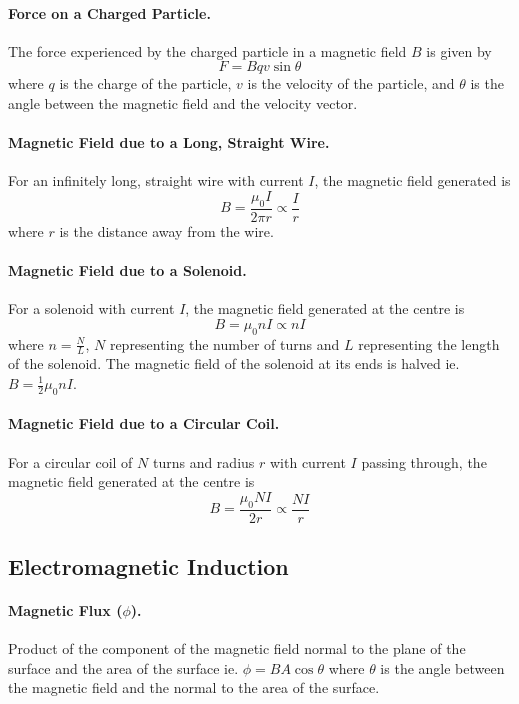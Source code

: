 \documentclass{article}
\begin{document}
\paragraph{Force on a Charged Particle.} The force experienced by the charged particle in a magnetic field $B$ is given by \begin{equation}
F = Bqv\sin\theta
\end{equation} where $q$ is the charge of the particle, $v$ is the velocity of the particle, and $\theta$ is the angle between the magnetic field and the velocity vector.

\paragraph{Magnetic Field due to a Long, Straight Wire.} For an infinitely long, straight wire with current $I$, the magnetic field generated is \begin{equation}
B = \frac{\mu_0I}{2\pi r} \propto \frac{I}{r}
\end{equation} where $r$ is the distance away from the wire.

\paragraph{Magnetic Field due to a Solenoid.} For a solenoid with current $I$, the magnetic field generated at the centre is \begin{equation}
B = \mu_0nI \propto nI
\end{equation} where $n = \frac{N}{L}$, $N$ representing the number of turns and $L$ representing the length of the solenoid. The magnetic field of the solenoid at its ends is halved ie. $B = \frac{1}{2}\mu_0nI$.

\paragraph{Magnetic Field due to a Circular Coil.} For a circular coil of $N$ turns and radius $r$ with current $I$ passing through, the magnetic field generated at the centre is \begin{equation}
B = \frac{\mu_0NI}{2r} \propto \frac{NI}{r}
\end{equation}

\subsection{Electromagnetic Induction}

\paragraph{Magnetic Flux ($\phi$).} Product of the component of the magnetic field normal to the plane of the surface and the area of the surface ie. $\phi = BA\cos\theta$ where $\theta$ is the angle between the magnetic field and the normal to the area of the surface.
\end{document}
